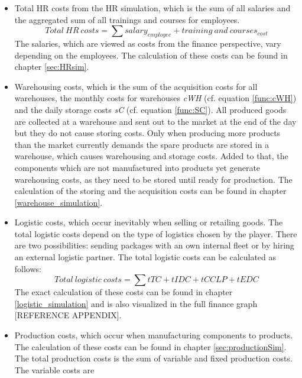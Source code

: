 \begin{itemize}
    \item Total HR costs from the HR simulation, which is the sum of all salaries and the aggregated sum of all trainings and courses for employees. 
    \begin{equation}
        Total~HR~costs = \sum salary_{employee} + training \ and \ courses_{cost}
    \end{equation}
    The salaries, which are viewed as costs from the finance perspective, vary depending on the employees. The calculation of these costs can be found in chapter  \ref{sec:HRsim}.
    \item Warehousing costs, which is the sum of the acquisition costs %
    for all warehouses, the monthly costs for warehouses \textit{cWH} (cf. equation \ref{func:cWH}) and the daily storage costs \textit{sC} (cf. equation \ref{func:SC}). All produced goods are collected at a warehouse and sent out to the market at the end of the day but they do not cause storing costs. Only when producing more products than the market currently demands the spare products are stored in a warehouse, which causes warehousing and storage costs. Added to that, the components which are not manufactured into products yet generate warehousing costs, as they need to be stored until ready for production. The calculation of the storing and the acquisition costs can be found in chapter \ref{warehouse_simulation}. 
    \item Logistic costs, which occur inevitably when selling or retailing goods. The total logistic costs depend on the type of logistics chosen by the player. There are two possibilities: sending packages with an own internal fleet or by hiring an external logistic partner. The total logistic costs can be calculated as follows:
    \begin{equation}
        Total \ logistic \ costs = \sum tTC + tIDC + tCCLP + tEDC
    \end{equation}
    The exact calculation of these costs can be found in chapter \ref{logistic_simulation} and is also visualized in the full finance graph [REFERENCE APPENDIX].
    \item Production costs, which occur when manufacturing components to products. The calculation of these costs can be found in chapter \ref{sec:productionSim}. The total production costs is the sum of variable and fixed production costs. The variable costs are 
    \begin{equation}

\end{equation}
\end{itemize}

